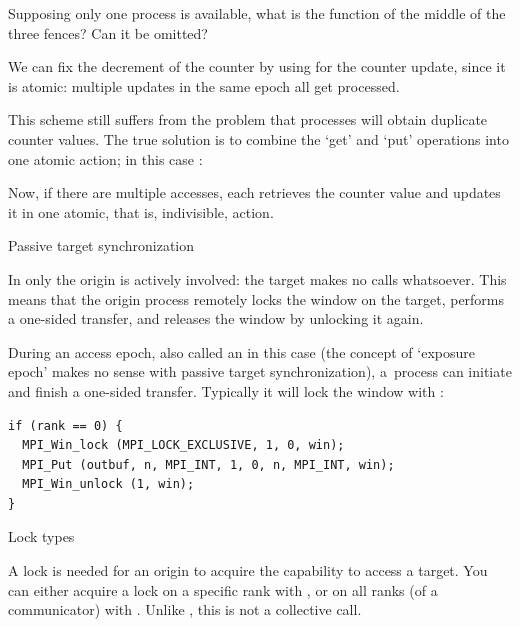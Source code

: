 \begin{exercise}
  Supposing only one process is available, what is the function
  of the middle of the three fences? Can it be omitted?
\end{exercise}

We can fix the decrement of the counter by using 
for the counter update, since it is atomic:
multiple updates in the same epoch all get processed.
%

This scheme still suffers from the problem that processes will obtain duplicate
counter values. The true solution is to combine the `get' and `put' operations
into one atomic action; in this case :
%

Now, if there are multiple accesses, each retrieves the counter value
and updates it in one atomic, that is, indivisible, action.


 {Passive target synchronization}
\label{sec:passive-sync}

In  only the origin is
actively involved: the target makes no calls whatsoever.
This means that the origin process remotely locks the window
on the target, performs a one-sided transfer, and releases the window
by unlocking it again.

During an access epoch, also called an
 in this case
(the concept of `exposure epoch' makes no sense with passive target synchronization),
a~process can initiate and finish a one-sided
transfer. Typically it will lock the window with
:

\begin{lstlisting}
if (rank == 0) {
  MPI_Win_lock (MPI_LOCK_EXCLUSIVE, 1, 0, win);
  MPI_Put (outbuf, n, MPI_INT, 1, 0, n, MPI_INT, win);
  MPI_Win_unlock (1, win);
}
\end{lstlisting}

 {Lock types}

A lock is needed for an origin to acquire the capability
to access a target.
You can either acquire a lock on a specific rank with ,
or on all ranks (of a communicator) with .
Unlike , this is not a collective call.

